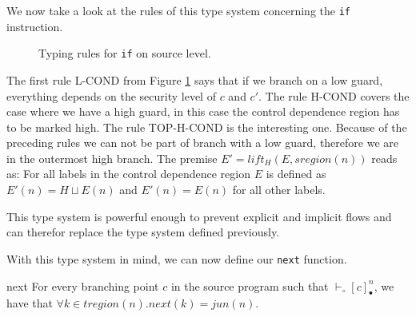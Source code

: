 \documentclass[a4paper,10pt]{llncs}
\begin{document}
We now take a look at the rules of this type system concerning the \texttt{if} instruction.

\begin{figure}
\begin{prooftree}
\end{prooftree}

\begin{prooftree}
\end{prooftree}

\begin{prooftree}
\end{prooftree}

\caption{Typing rules for \texttt{if} on source level.}
\label{fig:typing-rules-if}
\end{figure}

The first rule L-COND from Figure \ref{fig:typing-rules-if} says that if we branch on a low
guard, everything depends on the security level of $c$ and $c'$. The rule H-COND covers the
case where we have a high guard, in this case the control dependence region has to be marked
high. The rule TOP-H-COND is the interesting one. Because of the preceding rules we can not
be part of branch with a low guard, therefore we are in the outermost high branch. The premise
$E' = lift_H(E, sregion(n))$ reads as: For all labels in the control dependence region $E$ is
defined as $E'(n) = H \sqcup E(n)$ and $E'(n) = E(n)$ for all other labels.

This type system is powerful enough to prevent explicit and implicit flows and can therefor
replace the type system defined previously. 

With this type system in mind, we can now define our \texttt{next} function.

\begin{definition}{next}
For every branching point $c$ in the source program such that $\vdash_\circ [c]_\bullet^n$, we  have
that $\forall k \in tregion(n) . next(k) = jun(n)$.
\end{definition}
\end{document}
